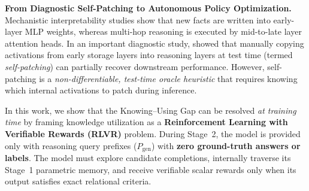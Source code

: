 \documentclass[11pt]{article}
\newcommand{\Pgen}{P_{\text{gen}}}
\theoremstyle{definition}
\begin{document}
\noindent\textbf{From Diagnostic Self-Patching to Autonomous Policy Optimization.} 
Mechanistic interpretability studies \cite{meng2022rome, cohen2024ROME_limits, tang2024ace} show that new facts are written into early-layer MLP weights, whereas multi-hop reasoning is executed by mid-to-late layer attention heads. In an important diagnostic study, \citet{dai2025mem2gen} showed that manually copying activations from early storage layers into reasoning layers at test time (termed \emph{self-patching}) can partially recover downstream performance. However, self-patching is a \emph{non-differentiable, test-time oracle heuristic} that requires knowing which internal activations to patch during inference.

In this work, we show that the Knowing--Using Gap can be resolved \emph{at training time} by framing knowledge utilization as a \textbf{Reinforcement Learning with Verifiable Rewards (RLVR)} problem. During Stage~2, the model is provided only with reasoning query prefixes ($\Pgen$) with \textbf{zero ground-truth answers or labels}. The model must explore candidate completions, internally traverse its Stage~1 parametric memory, and receive verifiable scalar rewards only when its output satisfies exact relational criteria.
\end{document}
